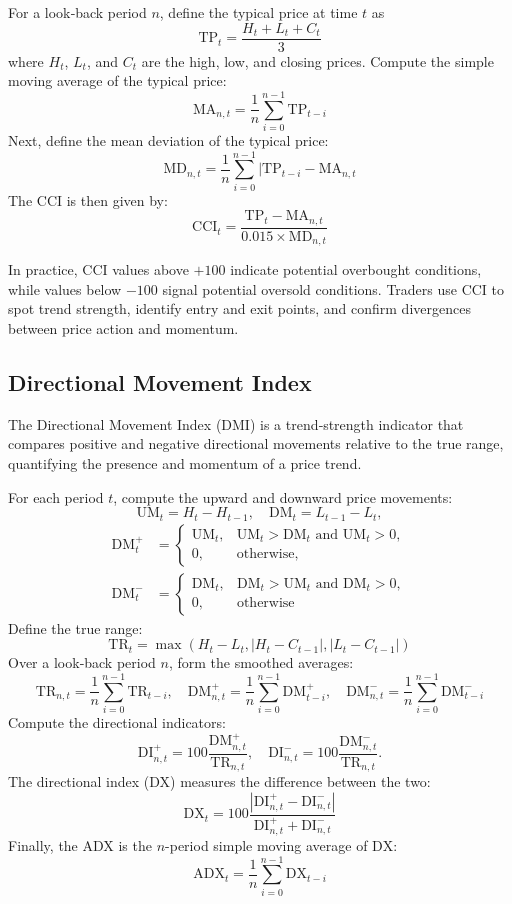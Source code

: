 For a look‐back period \(n\), define the typical price at time \(t\) as
\[\mathrm{TP}_t = \frac{H_t + L_t + C_t}{3}\]
where \(H_t\), \(L_t\), and \(C_t\) are the high, low, and closing prices.  Compute the simple moving average of the typical price:
\[\mathrm{MA}_{n,t} = \frac{1}{n} \sum_{i=0}^{n-1} \mathrm{TP}_{t-i}\]
Next, define the mean deviation of the typical price:
\[\mathrm{MD}_{n,t} = \frac{1}{n} \sum_{i=0}^{n-1} |\mathrm{TP}_{t-i} - \mathrm{MA}_{n,t}\]
The CCI is then given by:
\[\mathrm{CCI}_t = \frac{\mathrm{TP}_t - \mathrm{MA}_{n,t}}{0.015 \times \mathrm{MD}_{n,t}}\]

In practice, \gls{CCI} values above \(+100\) indicate potential overbought conditions, while values below \(-100\) signal potential oversold conditions. Traders use \gls{CCI} to spot trend strength, identify entry and exit points, and confirm divergences between price action and momentum.

\subsection{Directional Movement Index}
The Directional Movement Index (DMI) is a trend‐strength indicator that compares positive and negative directional movements relative to the true range, quantifying the presence and momentum of a price trend.

For each period \(t\), compute the upward and downward price movements:
\[\mathrm{UM}_t = H_t - H_{t-1}, \quad \mathrm{DM}_t = L_{t-1} - L_t,\]
\[
\begin{aligned}
\mathrm{DM}^+_t &= 
  \begin{cases}
    \mathrm{UM}_t, & \mathrm{UM}_t > \mathrm{DM}_t \text{ and } \mathrm{UM}_t > 0,\\
    0, & \text{otherwise},
  \end{cases}
  \\
\mathrm{DM}^-_t &= 
  \begin{cases}
    \mathrm{DM}_t, & \mathrm{DM}_t > \mathrm{UM}_t \text{ and } \mathrm{DM}_t > 0,\\
    0, & \text{otherwise}
  \end{cases}
\end{aligned}
\]
Define the true range:
\[\mathrm{TR}_t = \max(H_t - L_t, |H_t - C_{t-1}|, |L_t - C_{t-1}|)\]
Over a look‐back period \(n\), form the smoothed averages:
\[\mathrm{TR}_{n,t} = \frac{1}{n} \sum_{i=0}^{n-1} \mathrm{TR}_{t-i}, \quad \mathrm{DM}^+_{n,t} = \frac{1}{n} \sum_{i=0}^{n-1}\mathrm{DM}^+_{t-i}, \quad \mathrm{DM}^-_{n,t} = \frac{1}{n} \sum_{i=0}^{n-1} \mathrm{DM}^-_{t-i}\]
Compute the directional indicators:
\[\mathrm{DI}^+_{n,t} =100 \frac{\mathrm{DM}^+_{n,t}}{\mathrm{TR}_{n,t}}, \quad \mathrm{DI}^-_{n,t} = 100 \frac{\mathrm{DM}^-_{n,t}}{\mathrm{TR}_{n,t}}.\]
The directional index (DX) measures the difference between the two:
\[\mathrm{DX}_t = 100 \frac{|\mathrm{DI}^+_{n,t} - \mathrm{DI}^-_{n,t}|}{\mathrm{DI}^+_{n,t} + \mathrm{DI}^-_{n,t}}\]
Finally, the \gls{ADX} is the \(n\)-period simple moving average of \(\mathrm{DX}\):
\[\mathrm{ADX}_t = \frac{1}{n} \sum_{i=0}^{n-1} \mathrm{DX}_{t-i}\]

